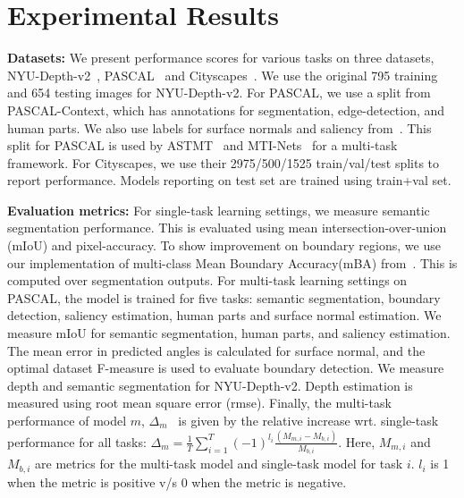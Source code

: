 \documentclass[final]{cvpr}
\begin{document}
\section{Experimental Results}\label{sec:experiment}

\noindent\textbf{Datasets:} We present performance scores for various tasks on three datasets, NYU-Depth-v2~\cite{silberman2012indoor}, PASCAL~\cite{pascal2014} and Cityscapes~\cite{cordts2016cityscapes}. We use the original 795 training and 654 testing images for NYU-Depth-v2. For PASCAL, we use a split from PASCAL-Context, which has annotations for segmentation, edge-detection, and human parts. We also use labels for surface normals and saliency from~\cite{maninis2019attentive}. This split for PASCAL is used by ASTMT~\cite{maninis2019attentive} and MTI-Nets~\cite{vandenhende2020mti} for a multi-task framework. For Cityscapes, we use their 2975/500/1525 train/val/test splits to report performance. Models reporting on test set are trained using train+val set.

\noindent\textbf{Evaluation metrics:} For single-task learning settings, we measure semantic segmentation performance. This is evaluated using mean intersection-over-union (mIoU) and pixel-accuracy. To show improvement on boundary regions, we use our implementation of multi-class Mean Boundary Accuracy(mBA) from~\cite{cheng2020cascadepsp}. This is computed over segmentation outputs. 
For multi-task learning settings on PASCAL, the model is trained for five tasks: semantic segmentation, boundary detection, saliency estimation, human parts and surface normal estimation. We measure mIoU for semantic segmentation, human parts, and saliency estimation. The mean error in predicted angles is calculated for surface normal, and the optimal dataset F-measure is used to evaluate boundary detection. We measure depth and semantic segmentation for NYU-Depth-v2. Depth estimation is measured using root mean square error (rmse). Finally, the multi-task performance of model $m$, \(\Delta_{m}\)~\cite{maninis2019attentive} is given by the relative increase wrt. single-task performance for all tasks:
\( \Delta_{m} = \frac{1}{T}\sum_{i=1}^{T} (-1)^{l_{i}}\frac{(M_{m,i}-M_{b,i})}{M_{b,i}} \).
Here, \(M_{m,i}\) and \(M_{b,i}\) are metrics for the multi-task model and single-task model for task $i$. $l_{i}$ is 1 when the metric is positive v/s 0 when the metric is negative.
\end{document}
